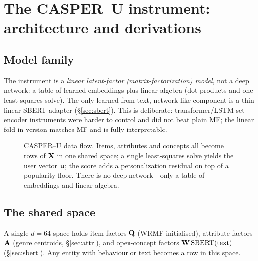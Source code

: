 \section{The CASPER--U instrument: architecture and derivations}\label{sec:arch}

\subsection{Model family}
The instrument is a \emph{linear latent-factor (matrix-factorization) model}, not a deep network: a table of
learned embeddings plus linear algebra (dot products and one least-squares solve). The only learned-from-text,
network-like component is a thin linear SBERT adapter (\S\ref{sec:sbert}). This is deliberate: transformer/LSTM
set-encoder instruments were harder to control and did not beat plain MF; the linear fold-in version matches MF
and is fully interpretable.

\begin{figure}[h]\centering
{}
\caption{CASPER--U data flow. Items, attributes and concepts all become rows of $\X$ in one shared space; a single
least-squares solve yields the user vector $\uu$; the score adds a personalization residual on top of a popularity
floor. There is no deep network---only a table of embeddings and linear algebra.}
\label{fig:arch}
\end{figure}

\subsection{The shared space}
A single $d{=}64$ space holds item factors $\Q$ (WRMF-initialised), attribute factors $\AA$ (genre centroids,
\S\ref{sec:attr}), and open-concept factors $\W\,\mathrm{SBERT}(\text{text})$ (\S\ref{sec:sbert}). Any entity with
behaviour or text becomes a row in this space.

